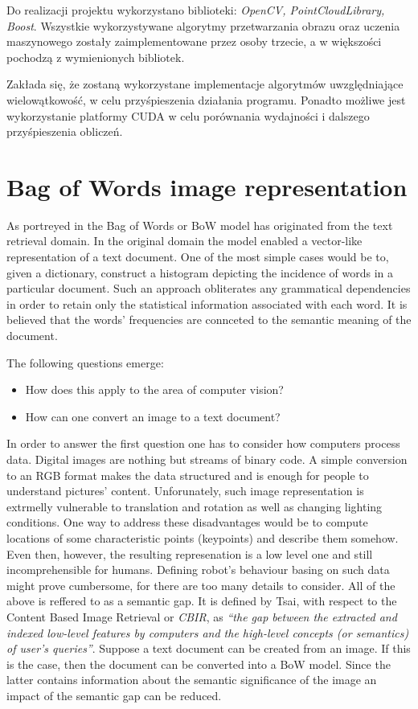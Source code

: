 \documentclass[a4paper,10pt]{article}
\begin{document}
  Do realizacji projektu wykorzystano biblioteki: \emph{OpenCV, PointCloudLibrary, Boost}. Wszystkie wykorzystywane algorytmy przetwarzania obrazu oraz uczenia maszynowego zostały zaimplementowane przez osoby trzecie, a w większości pochodzą z wymienionych bibliotek.
  
  Zakłada się, że zostaną wykorzystane implementacje algorytmów uwzględniające wielowątkowość, w celu przyśpieszenia działania programu. Ponadto możliwe jest wykorzystanie platformy CUDA w celu porównania wydajności i dalszego przyśpieszenia obliczeń.
 
\section{Bag of Words image representation}

  As portreyed in \cite{tsai2012bag} the Bag of Words or BoW model has originated from the text retrieval domain. In the original domain the model enabled a vector-like representation of a text document. One of the most simple cases would be to, given a dictionary, construct a histogram depicting the incidence of words in a particular document. Such an approach obliterates any grammatical dependencies in order to retain only the statistical information associated with each word. It is believed that the words' frequencies are connceted to the semantic meaning of the document.
  
  The following questions emerge: 
  \begin{itemize}
    \item How does this apply to the area of computer vision?
    \item How can one convert an image to a text document? 
  \end{itemize}
  
  In order to answer the first question one has to consider how computers process data. Digital images are nothing but streams of binary code. A simple conversion to an RGB format makes the data structured and is enough for people to understand pictures' content. Unforunately, such image representation is extrmelly vulnerable to translation and rotation as well as changing lighting conditions. One way to address these disadvantages would be to compute locations of some characteristic points (keypoints) and describe them somehow. Even then, however, the resulting represenation is a low level one and still incomprehensible for humans. Defining robot's behaviour basing on such data might prove cumbersome, for there are too many details to consider. All of the above is reffered to as a semantic gap. It is defined by Tsai, with respect to the Content Based Image Retrieval or \textit{CBIR}, as \emph{``the gap between the extracted and indexed low-level features by computers and the high-level concepts (or semantics) of user’s queries''}. Suppose a text document can be created from an image. If this is the case, then the document can be converted into a BoW model. Since the latter contains information about the semantic significance of the image an impact of the semantic gap can be reduced.
  
\end{document}
